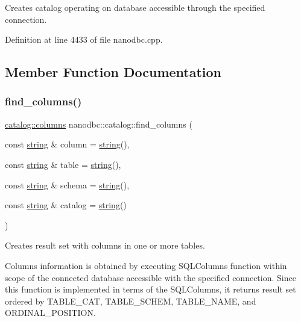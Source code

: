 Creates catalog operating on database accessible through the specified connection. 



Definition at line 4433 of file nanodbc.\+cpp.



\subsection{Member Function Documentation}
\mbox{\label{classnanodbc_1_1catalog_ae095ba2ea1953355c7bdfba3b9e99cfa}} 
\subsubsection{\texorpdfstring{find\_columns()}{find\_columns()}}
{\footnotesize\ttfamily \mbox{\hyperlink{classnanodbc_1_1catalog_1_1columns}{catalog\+::columns}} nanodbc\+::catalog\+::find\+\_\+columns (\begin{DoxyParamCaption}\item[{const \mbox{\hyperlink{namespacenanodbc_abfc0ece56278e590911ec8352774c212}{string}} \&}]{column = {\ttfamily \mbox{\hyperlink{namespacenanodbc_abfc0ece56278e590911ec8352774c212}{string}}()},  }\item[{const \mbox{\hyperlink{namespacenanodbc_abfc0ece56278e590911ec8352774c212}{string}} \&}]{table = {\ttfamily \mbox{\hyperlink{namespacenanodbc_abfc0ece56278e590911ec8352774c212}{string}}()},  }\item[{const \mbox{\hyperlink{namespacenanodbc_abfc0ece56278e590911ec8352774c212}{string}} \&}]{schema = {\ttfamily \mbox{\hyperlink{namespacenanodbc_abfc0ece56278e590911ec8352774c212}{string}}()},  }\item[{const \mbox{\hyperlink{namespacenanodbc_abfc0ece56278e590911ec8352774c212}{string}} \&}]{catalog = {\ttfamily \mbox{\hyperlink{namespacenanodbc_abfc0ece56278e590911ec8352774c212}{string}}()} }\end{DoxyParamCaption})}



Creates result set with columns in one or more tables. 

Columns information is obtained by executing {\ttfamily S\+Q\+L\+Columns} function within scope of the connected database accessible with the specified connection. Since this function is implemented in terms of the {\ttfamily S\+Q\+L\+Columns}, it returns result set ordered by T\+A\+B\+L\+E\+\_\+\+C\+AT, T\+A\+B\+L\+E\+\_\+\+S\+C\+H\+EM, T\+A\+B\+L\+E\+\_\+\+N\+A\+ME, and O\+R\+D\+I\+N\+A\+L\+\_\+\+P\+O\+S\+I\+T\+I\+ON.

